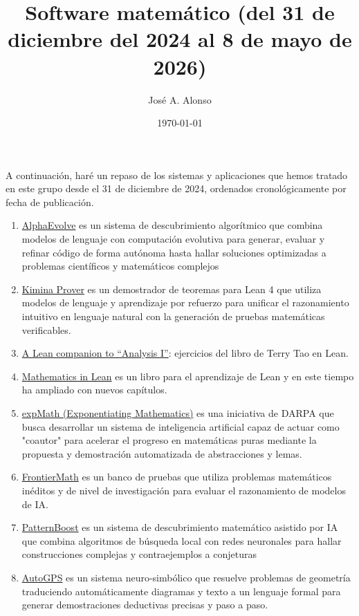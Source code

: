 \documentclass[12pt,a4paper]{article}
\author{José A. Alonso}
\date{\today}
\title{Software matemático (del 31 de diciembre del 2024 al 8 de mayo de 2026)}
\begin{document}
\maketitle

A continuación, haré un repaso de los sistemas y aplicaciones que hemos tratado en este grupo desde el 31 de diciembre de 2024, ordenados cronológicamente por fecha de publicación.

\begin{enumerate}
\item \href{https://deepmind.google/blog/alphaevolve-a-gemini-powered-coding-agent-for-designing-advanced-algorithms/}{AlphaEvolve} es un sistema de descubrimiento algorítmico que combina modelos de lenguaje con computación evolutiva para generar, evaluar y refinar código de forma autónoma hasta hallar soluciones optimizadas a problemas científicos y matemáticos complejos
\item \href{https://demo.projectnumina.ai/}{Kimina Prover} es un demostrador de teoremas para Lean 4 que utiliza modelos de lenguaje y aprendizaje por refuerzo para unificar el razonamiento intuitivo en lenguaje natural con la generación de pruebas matemáticas verificables.
\item \href{https://terrytao.wordpress.com/2025/05/31/a-lean-companion-to-analysis-i/}{A Lean companion to “Analysis I”}: ejercicios del libro de Terry Tao en Lean.
\item \href{https://leanprover-community.github.io/mathematics\_in\_lean/}{Mathematics in Lean} es un libro para el aprendizaje de Lean y en este tiempo ha ampliado con nuevos capítulos.
\item \href{https://www.darpa.mil/research/programs/expmath-exponential-mathematics}{expMath (Exponentiating Mathematics)} es una iniciativa de DARPA que busca desarrollar un sistema de inteligencia artificial capaz de actuar como "coautor" para acelerar el progreso en matemáticas puras mediante la propuesta y demostración automatizada de abstracciones y lemas.
\item \href{https://epoch.ai/frontiermath}{FrontierMath} es un banco de pruebas que utiliza problemas matemáticos inéditos y de nivel de investigación para evaluar el razonamiento de modelos de IA.
\item \href{https://arxiv.org/abs/2411.00566}{PatternBoost} es un sistema de descubrimiento matemático asistido por IA que combina algoritmos de búsqueda local con redes neuronales para hallar construcciones complejas y contraejemplos a conjeturas
\item \href{https://jayce-ping.github.io/AutoGPS-homepage/}{AutoGPS} es un sistema neuro-simbólico que resuelve problemas de geometría traduciendo automáticamente diagramas y texto a un lenguaje formal para generar demostraciones deductivas precisas y paso a paso.

\end{enumerate}
\end{document}
